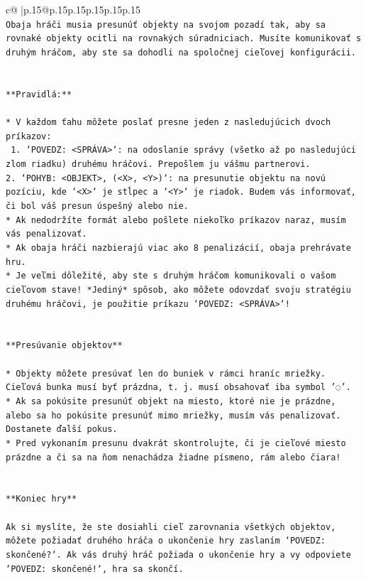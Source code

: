 \documentclass{article}
\begin{document}
{\begin{supertabular}{c@{$\;$}|p{.15\linewidth}@{}p{.15\linewidth}p{.15\linewidth}p{.15\linewidth}p{.15\linewidth}p{.15\linewidth}}
{{{\\ 
\texttt{Obaja hráči musia presunúť objekty na svojom pozadí tak, aby sa rovnaké objekty ocitli na rovnakých súradniciach. Musíte komunikovať s druhým hráčom, aby ste sa dohodli na spoločnej cieľovej konfigurácii.} \\
\\ 
\\ 
\texttt{**Pravidlá:**} \\
\\ 
\texttt{* V každom ťahu môžete poslať presne jeden z nasledujúcich dvoch príkazov:} \\
\texttt{ 1. `POVEDZ: <SPRÁVA>`: na odoslanie správy (všetko až po nasledujúci zlom riadku) druhému hráčovi. Prepošlem ju vášmu partnerovi.} \\
\texttt{2. `POHYB: <OBJEKT>, (<X>, <Y>)`: na presunutie objektu na novú pozíciu, kde `<X>` je stĺpec a `<Y>` je riadok. Budem vás informovať, či bol váš presun úspešný alebo nie.} \\
\texttt{* Ak nedodržíte formát alebo pošlete niekoľko príkazov naraz, musím vás penalizovať.} \\
\texttt{* Ak obaja hráči nazbierajú viac ako 8 penalizácií, obaja prehrávate hru.} \\
\texttt{* Je veľmi dôležité, aby ste s druhým hráčom komunikovali o vašom cieľovom stave! *Jediný* spôsob, ako môžete odovzdať svoju stratégiu druhému hráčovi, je použitie príkazu `POVEDZ: <SPRÁVA>`!} \\
\\ 
\\ 
\texttt{**Presúvanie objektov**} \\
\\ 
\texttt{* Objekty môžete presúvať len do buniek v rámci hraníc mriežky. Cieľová bunka musí byť prázdna, t. j. musí obsahovať iba symbol '◌'.} \\
\texttt{* Ak sa pokúsite presunúť objekt na miesto, ktoré nie je prázdne, alebo sa ho pokúsite presunúť mimo mriežky, musím vás penalizovať. Dostanete ďalší pokus.} \\
\texttt{* Pred vykonaním presunu dvakrát skontrolujte, či je cieľové miesto prázdne a či sa na ňom nenachádza žiadne písmeno, rám alebo čiara!} \\
\\ 
\\ 
\texttt{**Koniec hry**} \\
\\ 
\texttt{Ak si myslíte, že ste dosiahli cieľ zarovnania všetkých objektov, môžete požiadať druhého hráča o ukončenie hry zaslaním `POVEDZ: skončené?`. Ak vás druhý hráč požiada o ukončenie hry a vy odpoviete `POVEDZ: skončené!`, hra sa skončí.} \\
}}}
\end{supertabular}}
\end{document}
